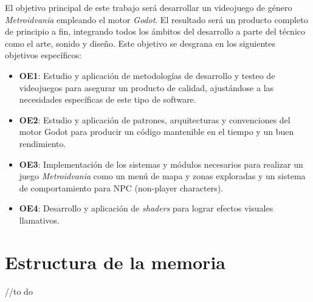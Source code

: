 El objetivo principal de este trabajo será desarrollar un videojuego de género \textit{Metroidvania} empleando el motor \textit{Godot}. El resultado será un producto completo de principio a fin, integrando todos los ámbitos del desarrollo a parte del técnico como el arte, sonido y diseño. Este objetivo se desgrana en los siguientes objetivos específicos:

\begin{itemize}
    \item \textbf{OE1}: Estudio y aplicación de metodologías de desarrollo y testeo de videojuegos para asegurar un producto de calidad, ajustándose a las necesidades específicas de este tipo de software.
    \item \textbf{OE2}: Estudio y aplicación de patrones, arquitecturas y convenciones del motor Godot para producir un código mantenible en el tiempo y un buen rendimiento.
    \item \textbf{OE3}: Implementación de los sistemas y módulos necesarios para realizar un juego \textit{Metroidvania} como un menú de mapa y zonas exploradas y un sistema de comportamiento para NPC (non-player characters).
    \item \textbf{OE4}: Desarrollo y aplicación de \textit{shaders} para lograr efectos visuales llamativos.

\end{itemize} 

\section{Estructura de la memoria}

//to do